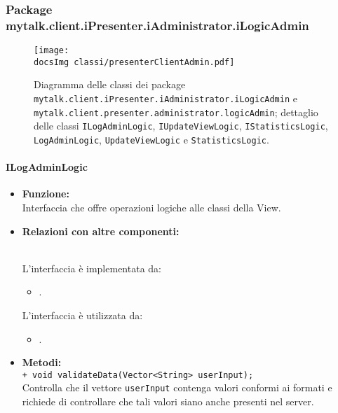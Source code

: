 {{\begin{sloppypar}
	
	
	
\newpage
	\subsubsection{Package mytalk.client.iPresenter.iAdministrator.iLogicAdmin}{
			
		\begin{figure}[h!tbp]
		\centering
		\label{fig:adminLogicAdmin}
		\texttt{[image: \\docsImg classi/presenterClientAdmin.pdf]}
\caption{Diagramma delle classi dei package \nolinkurl{mytalk.client.iPresenter.iAdministrator.iLogicAdmin} e  \nolinkurl{mytalk.client.presenter.administrator.logicAdmin}; dettaglio delle classi \nolinkurl{ILogAdminLogic}, \nolinkurl{IUpdateViewLogic}, \nolinkurl{IStatisticsLogic}, \nolinkurl{LogAdminLogic}, \nolinkurl{UpdateViewLogic} e \nolinkurl{StatisticsLogic}.}
	\end{figure}	

		\paragraph{ILogAdminLogic}\label{par:ILogAdminLogic}{
			\begin{itemize}
				\item[] \textbf{Funzione:}\\
				Interfaccia che offre operazioni logiche alle classi della View.\\
			
				\item[] \textbf{Relazioni con altre componenti:}{\\
					L'interfaccia è implementata da:
					\begin{itemize}
						\item[] .
					\end{itemize} 
					L'interfaccia è utilizzata da:
					\begin{itemize}
						\item[] .\\
					\end{itemize}
				}
			
				\item[] \textbf{Metodi:}{ \\
					\texttt{+ void validateData(Vector<String> userInput);}\\
					Controlla che il vettore \texttt{userInput} contenga valori conformi ai formati e richiede di controllare che tali valori siano anche presenti nel server\g.\\
				}
			\end{itemize}
			}
		
}
\end{sloppypar}}}

